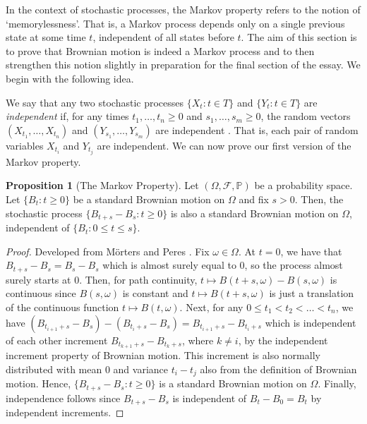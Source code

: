 \documentclass[a4paper,11pt]{article}
\theoremstyle{plain}
\theoremstyle{definition}
\newtheorem{proposition}[theorem]{Proposition}
\begin{document}
In the context of stochastic processes, the Markov property refers to the notion of `memorylessness'. That is, a Markov process depends only on a single previous state at some time $t$, independent of all states before $t$. The aim of this section is to prove that Brownian motion is indeed a Markov process and to then strengthen this notion slightly in preparation for the final section of the essay. We begin with the following idea.

We say that any two stochastic processes $\{X_t:t \in T\}$ and $\{Y_t:t \in T\}$ are \textit{independent} if, for any times $t_1,\dots,t_n \geq 0$ and $s_1,\dots,s_m \geq 0$, the random vectors $(X_{t_1},\dots,X_{t_n})$ and $(Y_{s_1},\dots,Y_{s_m})$ are independent \citep[p.~37]{M&P}. That is, each pair of random variables $X_{t_i}$ and $Y_{t_j}$ are independent. We can now prove our first version of the Markov property.


\begin{proposition}[The Markov Property]
Let $(\Omega, \mathcal{F}, \mathbb{P})$ be a probability space. Let $\{B_t:t \geq 0\}$ be a standard Brownian motion on $\Omega$ and fix $s > 0$. Then, the stochastic process $\{B_{t+s} - B_s:t \geq 0\}$ is also a standard Brownian motion on $\Omega$, independent of $\{B_t:0 \leq t \leq s\}$.
\end{proposition}

\begin{proof} Developed from M\"orters and Peres \citep[p.~37]{M&P}.
Fix $\omega \in \Omega$. At $t = 0$, we have that $B_{t+s} - B_s = B_s - B_s$ which is almost surely equal to $0$, so the process almost surely starts at $0$. Then, for path continuity, $t \mapsto B(t+s,\omega) - B(s,\omega)$ is continuous since $B(s,\omega)$ is constant and $t \mapsto B(t+s,\omega)$ is just a translation of the continuous function $t \mapsto B(t,\omega)$. Next, for any $0 \leq t_1 < t_2 < \dots <t_n$, we have $(B_{t_{i+1}+s} - B_{s}) - (B_{t_i+s} - B_{s}) = B_{t_{i+1}+s} - B_{t_i+s}$ which is independent of each other increment $B_{t_{k+1}+s} - B_{t_k+s}$, where $k \neq i$, by the independent increment property of Brownian motion. This increment is also normally distributed with mean $0$ and variance $t_i - t_j$ also from the definition of Brownian motion. Hence, $\{B_{t+s} - B_s:t \geq 0\}$ is a standard Brownian motion on $\Omega$. Finally, independence follows since $B_{t+s} - B_{s}$ is independent of $B_t - B_0 = B_t$ by independent increments.
\end{proof}
\end{document}
